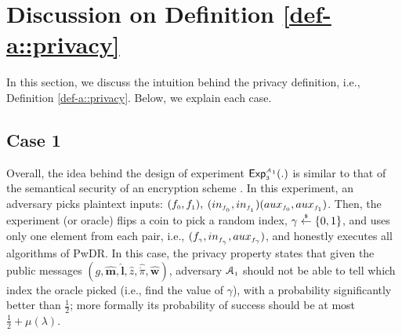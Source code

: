 
\vspace{-3mm}
\section{Discussion on Definition \ref{def-a::privacy}}\label{sec:Further-Disc-Privacy-Def}


In this section, we discuss the intuition behind the privacy definition, i.e., Definition \ref{def-a::privacy}. Below, we explain each case.

%

\vspace{-3mm}

\subsection{Case 1} Overall, the idea behind the design of  experiment $\mathsf{Exp}_{\scriptscriptstyle 3}^{\scriptscriptstyle\mathcal{A}_{\scriptscriptstyle 1}}(.)$ is similar to that of the semantical security of an encryption scheme \cite{DBLP:books/crc/KatzLindell2014}. In this experiment, an adversary picks plaintext inputs:  $(f_{\scriptscriptstyle 0}, f_{\scriptscriptstyle 1}),$ $(in_{\scriptscriptstyle f_{\scriptscriptstyle_{\scriptscriptstyle 0}}},in_{\scriptscriptstyle f_{\scriptscriptstyle _1}}) ({aux}_{\scriptscriptstyle f_{0}},{aux}_{\scriptscriptstyle f_{\scriptscriptstyle1}})$. Then, the experiment (or oracle) flips a coin to pick a random index, $\gamma\stackrel{\scriptscriptstyle \$}\leftarrow\{0,1\}$, and uses only one element from each pair, i.e., $(f_{\scriptscriptstyle \gamma}, in_{\scriptscriptstyle f_{\scriptscriptstyle_{\scriptscriptstyle \gamma}}}, {aux}_{\scriptscriptstyle f_{\gamma}})$, and honestly executes all algorithms of PwDR. In this case, the privacy property states that given the public messages $(g, \hat {\bm m}, \hat{\bm l}, \hat z, \hat{\ddot \pi}, \hat{\bm{w}})$,  adversary $\mathcal{A}_{\scriptscriptstyle 1}$ should not be able to tell which index the oracle picked (i.e., find the value of $\gamma$), with a probability significantly better than $\frac{1}{2}$; more formally its probability of success should be at most $\frac{1}{2}+\mu(\lambda)$.
%


\vspace{-3mm}

